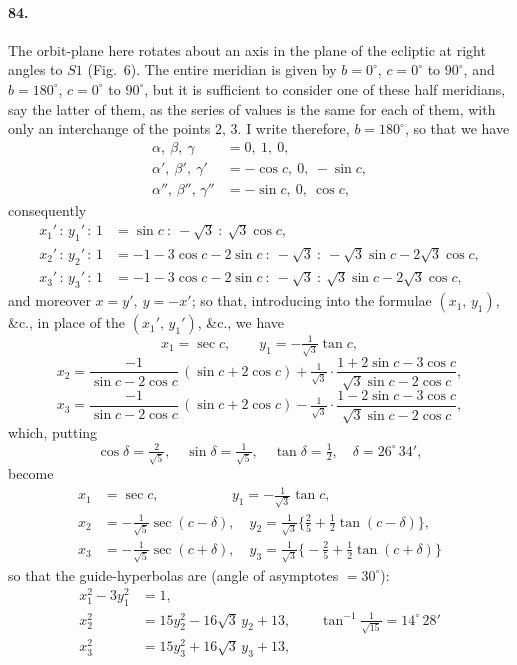 \documentclass[11pt]{article}
\begin{document}
\paragraph{84.} The orbit-plane here rotates about an axis in the plane of the ecliptic at right angles to $S1$ (Fig.~$6$). The entire meridian is given by $b = 0^{\circ}$, $c = 0^{\circ}$ to $90^{\circ}$, and $b = 180^{\circ}$, $c = 0^{\circ}$ to $90^{\circ}$, but it is sufficient to consider one of these half meridians, say the latter of them, as the series of values is the same for each of them, with only an interchange of the points $2,\, 3$. I write therefore, $b = 180^{\circ}$, so that we have
\[
\begin{aligned}
\alpha,\ \beta,\ \gamma &= 0,\ 1,\ 0,\\
\alpha',\ \beta',\ \gamma' &= -\cos c,\ 0,\ -\sin c,\\
\alpha'',\, \beta'',\, \gamma'' &= -\sin c,\ 0,\ \cos c,
\end{aligned}
\]
consequently
\[
\begin{aligned}
x_{1}'\,:\,y_{1}'\,:\,1 &= \sin c\ :\ -\sqrt{3}\ :\ \sqrt{3}\cos c,\\
x_{2}'\,:\,y_{2}'\,:\,1 &= -1 - 3\cos c - 2\sin c\ :\ -\sqrt{3}\ :\ -\sqrt{3}\sin c - 2\sqrt{3}\cos c,\\
x_{3}'\,:\,y_{3}'\,:\,1 &= -1 - 3\cos c - 2\sin c\ :\ -\sqrt{3}\ :\ \sqrt{3}\sin c - 2\sqrt{3}\cos c,
\end{aligned}
\]
and moreover $x = y',\ y = -x'$; so that, introducing into the formulae $(x_{1},\, y_{1})$, \&c., in place of the $(x_{1}',\, y_{1}')$, \&c., we have
\[
x_{1} = \sec c,\qquad y_{1} = -\tfrac{1}{\sqrt{3}}\tan c,
\]
\[
x_{2} = \dfrac{-1}{\sin c - 2\cos c}\,(\sin c + 2\cos c) + \tfrac{1}{\sqrt{3}}\cdot\dfrac{1 + 2\sin c - 3\cos c}{\sqrt{3}\sin c - 2\cos c},
\]
\[
x_{3} = \dfrac{-1}{\sin c - 2\cos c}\,(\sin c + 2\cos c) - \tfrac{1}{\sqrt{3}}\cdot\dfrac{1 - 2\sin c - 3\cos c}{\sqrt{3}\sin c - 2\cos c},
\]
which, putting
\[
\cos\delta = \tfrac{2}{\sqrt{5}},\quad \sin\delta = \tfrac{1}{\sqrt{5}},\quad \tan\delta = \tfrac{1}{2},\quad \delta = 26^{\circ}\,34',
\]
become
\[
\begin{aligned}
x_{1} &= \sec c,\qquad\qquad\quad\, y_{1} = -\tfrac{1}{\sqrt{3}}\tan c,\\
x_{2} &= -\tfrac{1}{\sqrt{5}}\sec(c - \delta),\quad y_{2} = \tfrac{1}{\sqrt{3}}\bigl\{\tfrac{2}{5} + \tfrac{1}{2}\tan(c - \delta)\bigr\},\\
x_{3} &= -\tfrac{1}{\sqrt{5}}\sec(c + \delta),\quad y_{3} = \tfrac{1}{\sqrt{3}}\bigl\{-\tfrac{2}{5} + \tfrac{1}{2}\tan(c + \delta)\bigr\}
\end{aligned}
\]
so that the guide-hyperbolas are (angle of asymptotes $= 30^{\circ}$):
\[
\begin{aligned}
x_{1}^{2} - 3y_{1}^{2} &= 1,\\
x_{2}^{2} &= 15y_{2}^{2} - 16\sqrt{3}\,y_{2} + 13,\qquad \tan^{-1}\tfrac{1}{\sqrt{15}} = 14^{\circ}\,28'\\
x_{3}^{2} &= 15y_{3}^{2} + 16\sqrt{3}\,y_{3} + 13,\qquad
\end{aligned}
\]
\end{document}

